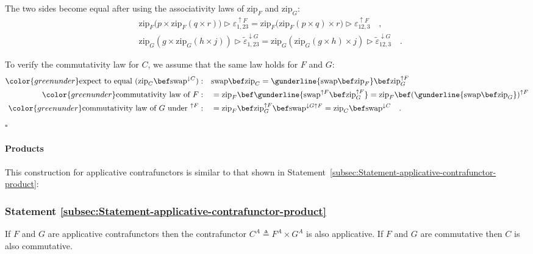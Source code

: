 The two sides become equal after using the associativity laws of $\text{zip}_{F}$
and $\text{zip}_{G}$:
\begin{align*}
 & \text{zip}_{F}\big(p\times\text{zip}_{F}(q\times r)\big)\triangleright\varepsilon_{1,23}^{\uparrow F}=\text{zip}_{F}\big(\text{zip}_{F}(p\times q)\times r\big)\triangleright\varepsilon_{12,3}^{\uparrow F}\quad,\\
 & \text{zip}_{G}(g\times\text{zip}_{G}(h\times j))\triangleright\tilde{\varepsilon}_{1,23}^{\downarrow G}=\text{zip}_{G}(\text{zip}_{G}(g\times h)\times j)\triangleright\tilde{\varepsilon}_{12,3}^{\downarrow G}\quad.
\end{align*}

To verify the commutativity law for $C$, we assume that the same
law holds for $F$ and $G$:
\begin{align*}
{\color{greenunder}\text{expect to equal }(\text{zip}_{C}\bef\text{swap}^{\downarrow C}):}\quad & \text{swap}\bef\text{zip}_{C}=\gunderline{\text{swap}\bef\text{zip}_{F}}\bef\text{zip}_{G}^{\uparrow F}\\
{\color{greenunder}\text{commutativity law of }F:}\quad & =\text{zip}_{F}\bef\gunderline{\text{swap}^{\uparrow F}\bef\text{zip}_{G}^{\uparrow F}}=\text{zip}_{F}\bef(\gunderline{\text{swap}\bef\text{zip}_{G}})^{\uparrow F}\\
{\color{greenunder}\text{commutativity law of }G\text{ under }^{\uparrow F}:}\quad & =\text{zip}_{F}\bef\text{zip}_{G}^{\uparrow F}\bef\text{swap}^{\downarrow G\uparrow F}=\text{zip}_{C}\bef\text{swap}^{\downarrow C}\quad.
\end{align*}
$\square$

\paragraph{Products}

This construction for applicative contrafunctors is similar to that
shown in Statement~\ref{subsec:Statement-applicative-contrafunctor-product}:

\subsubsection{Statement \label{subsec:Statement-applicative-contrafunctor-product}\ref{subsec:Statement-applicative-contrafunctor-product}}

If $F$ and $G$ are applicative contrafunctors then the contrafunctor
$C^{A}\triangleq F^{A}\times G^{A}$ is also applicative. If $F$
and $G$ are commutative then $C$ is also commutative.

